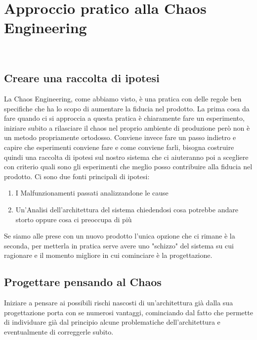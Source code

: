 
\chapter{Approccio pratico alla Chaos Engineering}
\label{cap:descrizione-stage}

\\

\section{Creare una raccolta di ipotesi}
La Chaos Engineering, come abbiamo visto, è una pratica con delle regole ben specifiche che ha lo scopo di aumentare la fiducia nel prodotto.
La prima cosa da fare quando ci si approccia a questa pratica è chiaramente fare un esperimento, iniziare subito a rilasciare il chaos nel proprio ambiente di produzione però non è un metodo propriamente ortodosso.
Conviene invece fare un passo indietro e capire che esperimenti conviene fare e come conviene farli, bisogna costruire quindi una raccolta di ipotesi sul nostro sistema che ci aiuteranno poi a scegliere con criterio quali sono gli esperimenti che meglio posso contribuire alla fiducia nel prodotto.
Ci sono due fonti principali di ipotesi:
\begin{enumerate}
    \item I Malfunzionamenti passati analizzandone le cause
    \item Un'Analisi dell'architettura del sistema chiedendosi cosa potrebbe andare storto oppure cosa ci preoccupa di più
\end{enumerate}
Se siamo alle prese con un nuovo prodotto l'unica opzione che ci rimane è la seconda, per metterla in pratica serve avere uno "schizzo" del sistema su cui ragionare e il momento migliore in cui cominciare è la progettazione.

\section{Progettare pensando al Chaos}
Iniziare a pensare ai possibili rischi nascosti di un'architettura già dalla sua progettazione porta con se numerosi vantaggi, cominciando dal fatto che permette di individuare già dal principio alcune problematiche dell'architettura e eventualmente di correggerle subito.

